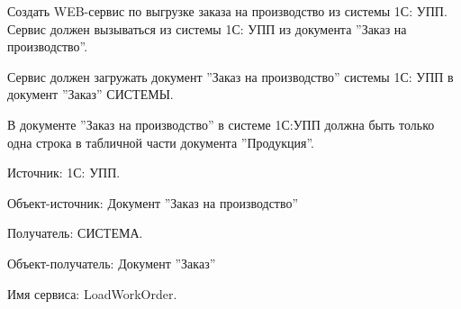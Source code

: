 \label{exchange:LoadWorkOrder}

 Создать WEB-сервис по выгрузке заказа на производство из системы 1С: УПП.
 Сервис должен вызываться из системы 1С: УПП из документа ''Заказ на производство''.
 
 
 Сервис должен загружать документ ''Заказ на производство'' системы 1С: УПП в документ ''Заказ'' СИСТЕМЫ.

 В документе ''Заказ на производство'' в системе 1С:УПП должна быть только одна строка в табличной части документа ''Продукция''.
 
Источник: 1С: УПП.

Объект-источник: Документ ''Заказ на производство'' 

Получатель: СИСТЕМА.

Объект-получатель: Документ ''Заказ''

 Имя сервиса: LoadWorkOrder.

 




